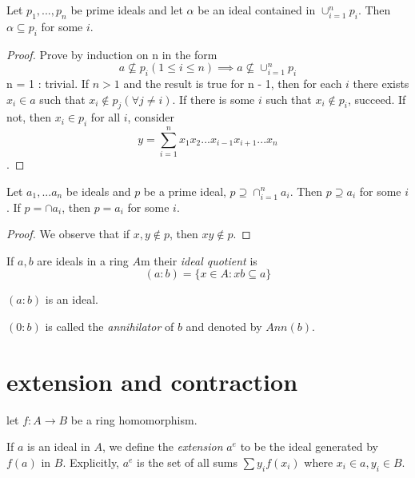 \documentclass[11pt,fleqn]{book} %
\begin{document}
\begin{CJK}{UTF8}{gkai}
\begin{proposition}
	Let $p_1, ... , p_n$ be prime ideals and let $\alpha$ be an ideal contained in $\cup_{i=1}^n p_i$. Then $\alpha \subseteq p_i$ for some $i$. 
\end{proposition}
\begin{proof}
	Prove by induction on n in the form 
	\[a \nsubseteq p_i (1\leq i \leq n) \implies a\nsubseteq \cup_{i=1}^n p_i\]
	n = 1 : trivial. If $n>1$ and the result is true for n - 1, then for each $i$ there exists $x_i \in a$ such that $x_i \notin p_j(\forall j\neq i)$. If there is some $i$ such that $x_i \notin p_i$, succeed. If not, then $x_i \in p_i$ for all $i$,
	consider
	\[y = \sum_{i=1}^{n}x_1x_2...x_{i-1}x_{i+1}...x_n\].
\end{proof}


\begin{proposition}
	Let $a_1,...a_n$ be ideals and $p$ be a prime ideal, $p \supseteq \cap_{i=1}^n a_i$. Then $p \supseteq a_i$ for some $i$. If $p = \cap a_i$, then $p = a_i$ for some $i$.
\end{proposition}
\begin{proof}
	We observe that if $x,y \notin p$, then $xy \notin p$.
\end{proof}

\begin{definition}
	If $a, b$ are ideals in a ring $A$m their {\it ideal quotient} is 
	\[(a : b) = \{x\in A : xb\subseteq a\}\]
\end{definition}
\begin{remark}
	$(a :b)$ is an ideal.
\end{remark}

\begin{definition}
	[annihilator] $(0:b)$ is called the {\it annihilator} of $b$ and denoted by $Ann(b)$.
\end{definition}

\section{extension and contraction}
let $f: A \to B$ be a ring homomorphism.
\begin{definition}
	[extension]
	If $a$ is an ideal in $A$, we define the {\it extension} $a^e$ to be the ideal generated by $f(a)$ in $B$. Explicitly, $a^e$ is the set of all sums $\sum y_if(x_i)$ where $x_i \in a, y_i \in B$.
\end{definition}


\end{CJK}
\end{document}
